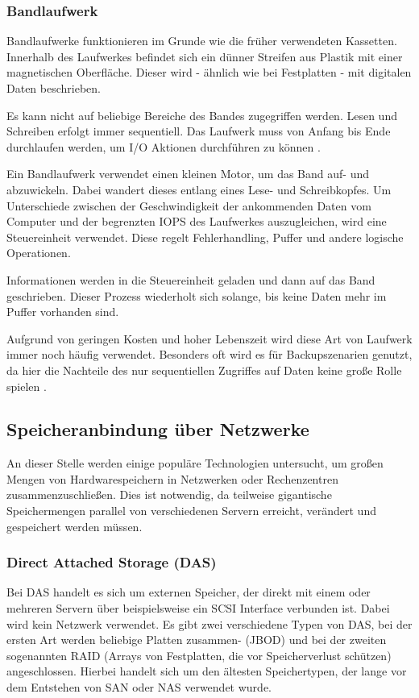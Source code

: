 \subsubsection{Bandlaufwerk}

Bandlaufwerke funktionieren im Grunde wie die früher verwendeten Kassetten. Innerhalb des Laufwerkes befindet sich ein dünner Streifen aus Plastik mit einer magnetischen Oberfläche. Dieser wird - ähnlich wie bei Festplatten - mit digitalen Daten beschrieben. 

Es kann nicht auf beliebige Bereiche des Bandes zugegriffen werden. Lesen und Schreiben erfolgt immer sequentiell. Das Laufwerk muss von Anfang bis Ende durchlaufen werden, um I/O Aktionen durchführen zu können \parencite{adrc.2009}.

Ein Bandlaufwerk verwendet einen kleinen Motor, um das Band auf- und abzuwickeln. Dabei wandert dieses entlang eines Lese- und Schreibkopfes. Um Unterschiede zwischen der Geschwindigkeit der ankommenden Daten vom Computer und der begrenzten \gls{IOPS} des Laufwerkes auszugleichen, wird eine Steuereinheit verwendet. Diese regelt Fehlerhandling, Puffer und andere logische Operationen.

Informationen werden in die Steuereinheit geladen und dann auf das Band geschrieben. Dieser Prozess wiederholt sich solange, bis keine Daten mehr im Puffer vorhanden sind.

Aufgrund von geringen Kosten und hoher Lebenszeit wird diese Art von Laufwerk immer noch häufig verwendet. Besonders oft wird es für Backupszenarien genutzt, da hier die Nachteile des nur sequentiellen Zugriffes auf Daten keine große Rolle spielen \parencite{adrc.2009}. 

\subsection{Speicheranbindung über Netzwerke}

An dieser Stelle werden einige populäre Technologien untersucht, um großen Mengen von Hardwarespeichern in Netzwerken oder Rechenzentren zusammenzuschließen. Dies ist notwendig, da teilweise gigantische Speichermengen parallel von verschiedenen Servern erreicht, verändert und gespeichert werden müssen.

\subsubsection{Direct Attached Storage (DAS)}

Bei \ac{DAS} handelt es sich um externen Speicher, der direkt mit einem oder mehreren Servern über beispielsweise ein \gls{SCSI} Interface verbunden ist. Dabei wird kein Netzwerk verwendet. Es gibt zwei verschiedene Typen von \ac{DAS}, bei der ersten Art werden beliebige Platten zusammen- (\ac{JBOD}) und bei der zweiten sogenannten \acs{RAID} (Arrays von Festplatten, die vor Speicherverlust schützen) angeschlossen.
Hierbei handelt sich um den ältesten Speichertypen, der lange vor dem Entstehen von SAN oder NAS verwendet wurde.

